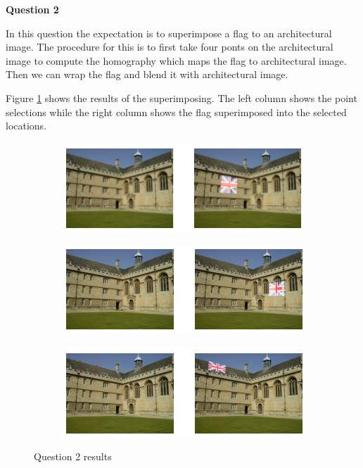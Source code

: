 \documentclass[11pt]{article}
\begin{document}
\noindent \textbf{Question 2}

\noindent In this question the expectation is to superimpose a flag to an architectural image. The procedure for this is to first take four ponts
on the architectural image to compute the homography which maps the flag to architectural image. Then we can wrap the flag and blend it with architectural
image. 

\noindent Figure \ref{Q2} shows the results of the superimposing. The left column shows the point selections while the right column shows
the flag superimposed into the selected locations.


\begin{figure}
    \centering
    \begin{subfigure}[][10pt][b]{0.8\textwidth}
        \centering
        \includegraphics[width=\textwidth]{Images/21.png}
        \subcaption{}
    \end{subfigure}
    \begin{subfigure}[b]{0.8\textwidth}
        \centering
        \includegraphics[width=\textwidth]{Images/22.png}
        \subcaption{}
    \end{subfigure}
    \begin{subfigure}[b]{0.8\textwidth}
        \centering
        \includegraphics[width=\textwidth]{Images/23.png}
        \subcaption{}
    \end{subfigure}
       \caption{Question 2 results}
       \label{Q2}
\end{figure}

%
%
\end{document}
